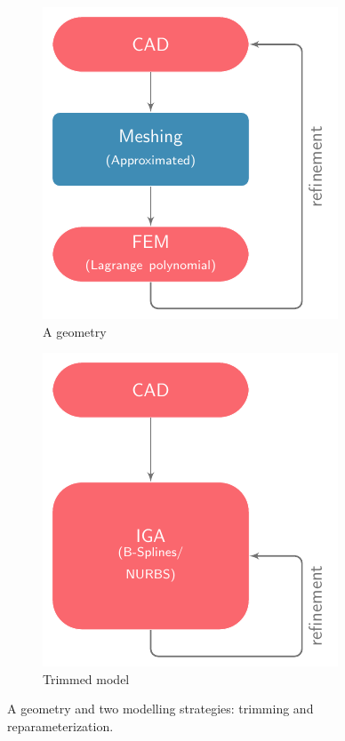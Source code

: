 \begin{figure}[ht]
	\captionsetup[subfigure]{labelformat=empty, font = footnotesize}
	\centering
	\begin{subfigure}[b]{0.46\textwidth}
		\centering
		\includegraphics[scale=1]{flow-chart-fem}
		\caption{A geometry}
	\end{subfigure}
	\begin{subfigure}[b]{0.46\textwidth}
		\centering
		\includegraphics[scale=1]{flow-chart-iga}
		\caption{Trimmed model}
	\end{subfigure}
	\caption{A geometry and two modelling strategies: trimming and reparameterization.}
	\label{fig:flow_chart}
\end{figure}


